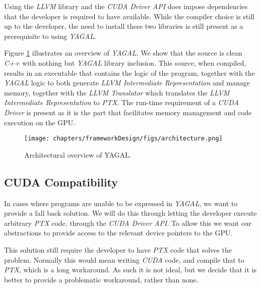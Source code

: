 Using the \textit{LLVM} library and the \textit{CUDA Driver API} does impose dependencies that the developer is required to have available. While the compiler choice is still up to the developer, the need to install these two libraries is still present as a prerequisite to using \textit{YAGAL}.

Figure \ref{fig:architectureOverview} illustrates an overview of \textit{YAGAL}. We show that the source is clean \textit{C++} with nothing but \textit{YAGAL} library inclusion. This source, when compiled, results in an executable that contains the logic of the program, together with the \textit{YAGAL} logic to both generate \textit{LLVM Intermediate Representation} and manage memory, together with the \textit{LLVM Translator} which translates the \textit{LLVM Intermediate Representation} to \textit{PTX}. The run-time requirement of a \textit{CUDA Driver} is present as it is the part that facilitates memory management and code execution on the GPU.

\begin{figure}[H]
\center
\texttt{[image: chapters/frameworkDesign/figs/architecture.png]}
\caption{Architectural overview of YAGAL.}
\label{fig:architectureOverview}
\end{figure}


\subsection{CUDA Compatibility}
In cases where programs are unable to be expressed in \textit{YAGAL}, we want to provide a fall back solution. We will do this through letting the developer execute arbitrary \textit{PTX} code, through the \textit{CUDA Driver API}. To allow this we want our abstractions to provide access to the relevant device pointers to the GPU.

This solution still require the developer to have \textit{PTX} code that solves the problem. Normally this would mean writing \textit{CUDA} code, and compile that to \textit{PTX}, which is a long workaround. As such it is not ideal, but we decide that it is better to provide a problematic workaround, rather than none.